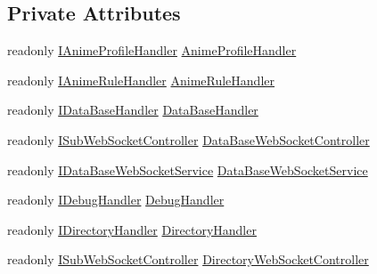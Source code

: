 \subsection*{Private Attributes}
\begin{DoxyCompactItemize}
\item 
readonly \mbox{\hyperlink{interface_little_weeb_library_1_1_handlers_1_1_i_anime_profile_handler}{I\+Anime\+Profile\+Handler}} \mbox{\hyperlink{class_little_weeb_library_1_1_start_up_a0001440b687fc61abdbc98936f1093e9}{Anime\+Profile\+Handler}}
\item 
readonly \mbox{\hyperlink{interface_little_weeb_library_1_1_handlers_1_1_i_anime_rule_handler}{I\+Anime\+Rule\+Handler}} \mbox{\hyperlink{class_little_weeb_library_1_1_start_up_a005fb782af2d30e4cb6b8b4587f58403}{Anime\+Rule\+Handler}}
\item 
readonly \mbox{\hyperlink{interface_little_weeb_library_1_1_handlers_1_1_i_data_base_handler}{I\+Data\+Base\+Handler}} \mbox{\hyperlink{class_little_weeb_library_1_1_start_up_a83747f1927dc289d85a8b4b26844952d}{Data\+Base\+Handler}}
\item 
readonly \mbox{\hyperlink{interface_little_weeb_library_1_1_controllers_1_1_i_sub_web_socket_controller}{I\+Sub\+Web\+Socket\+Controller}} \mbox{\hyperlink{class_little_weeb_library_1_1_start_up_a0d332718adef991399ef83c637f60fd8}{Data\+Base\+Web\+Socket\+Controller}}
\item 
readonly \mbox{\hyperlink{interface_little_weeb_library_1_1_services_1_1_i_data_base_web_socket_service}{I\+Data\+Base\+Web\+Socket\+Service}} \mbox{\hyperlink{class_little_weeb_library_1_1_start_up_aa330ff3b4b2a2d501b127f99cfaddc12}{Data\+Base\+Web\+Socket\+Service}}
\item 
readonly \mbox{\hyperlink{interface_little_weeb_library_1_1_handlers_1_1_i_debug_handler}{I\+Debug\+Handler}} \mbox{\hyperlink{class_little_weeb_library_1_1_start_up_a52de928ecf0e2495e16511d6d00486f1}{Debug\+Handler}}
\item 
readonly \mbox{\hyperlink{interface_little_weeb_library_1_1_handlers_1_1_i_directory_handler}{I\+Directory\+Handler}} \mbox{\hyperlink{class_little_weeb_library_1_1_start_up_aac37cfb46ad45608bea3fe2547ac4dce}{Directory\+Handler}}
\item 
readonly \mbox{\hyperlink{interface_little_weeb_library_1_1_controllers_1_1_i_sub_web_socket_controller}{I\+Sub\+Web\+Socket\+Controller}} \mbox{\hyperlink{class_little_weeb_library_1_1_start_up_a7d9287cfe0c87dd727af3e0932905870}{Directory\+Web\+Socket\+Controller}}
\item 

\end{DoxyCompactItemize}
